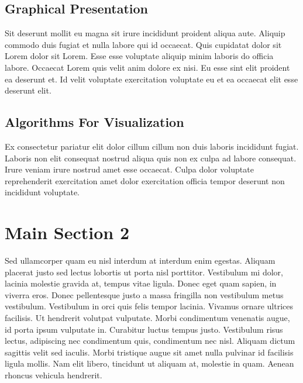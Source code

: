 \subsection{Graphical Presentation}

Sit deserunt mollit eu magna sit irure incididunt proident aliqua aute. Aliquip commodo duis fugiat et nulla labore qui id occaecat. Quis cupidatat dolor sit Lorem dolor sit Lorem. Esse esse voluptate aliquip minim laboris do officia labore. Occaecat Lorem quis velit anim dolore ex nisi. Eu esse sint elit proident ea deserunt et. Id velit voluptate exercitation voluptate eu et ea occaecat elit esse deserunt elit.

\subsection{Algorithms For Visualization}

Ex consectetur pariatur elit dolor cillum cillum non duis laboris incididunt fugiat. Laboris non elit consequat nostrud aliqua quis non ex culpa ad labore consequat. Irure veniam irure nostrud amet esse occaecat. Culpa dolor voluptate reprehenderit exercitation amet dolor exercitation officia tempor deserunt non incididunt voluptate.


\section{Main Section 2}

Sed ullamcorper quam eu nisl interdum at interdum enim egestas. Aliquam placerat justo sed lectus lobortis ut porta nisl porttitor. Vestibulum mi dolor, lacinia molestie gravida at, tempus vitae ligula. Donec eget quam sapien, in viverra eros. Donec pellentesque justo a massa fringilla non vestibulum metus vestibulum. Vestibulum in orci quis felis tempor lacinia. Vivamus ornare ultrices facilisis. Ut hendrerit volutpat vulputate. Morbi condimentum venenatis augue, id porta ipsum vulputate in. Curabitur luctus tempus justo. Vestibulum risus lectus, adipiscing nec condimentum quis, condimentum nec nisl. Aliquam dictum sagittis velit sed iaculis. Morbi tristique augue sit amet nulla pulvinar id facilisis ligula mollis. Nam elit libero, tincidunt ut aliquam at, molestie in quam. Aenean rhoncus vehicula hendrerit.